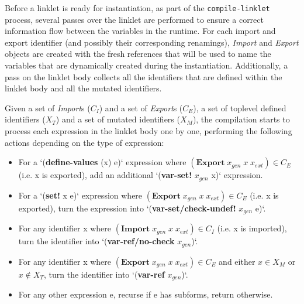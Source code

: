 Before a linklet is ready for instantiation, as part of the
\verb|compile-linklet| process, several passes over the linklet are
performed to ensure a correct information flow between the variables
in the run\dash time. For each import and export identifier (and
possibly their corresponding renamings), \textit{Import} and
\textit{Export} objects are created with the fresh references that
will be used to name the variables that are dynamically created during
the instantiation. Additionally, a pass on the linklet body collects
all the identifiers that are defined within the linklet body and all
the mutated identifiers.

Given a set of \textit{Import}s ($\mathit{C_I}$) and a set of
\textit{Export}s ($\mathit{C_E}$), a set of toplevel defined
identifiers ($\mathit{X_T}$) and a set of mutated identifiers
($\mathit{X_M}$), the compilation starts to process each expression in
the linklet body one by one, performing the following actions
depending on the type of expression:

\begin{itemize}
  \footnotesize
\item For a `(\textbf{define-values} (x) e)` expression where $(\textbf{Export}\; x_{gen}\; x\; x_{ext}) \in \mathit{C_E}$ (i.e. x is exported), add an additional `(\textbf{var-set!} $x_{gen}$ x)` expression.
\item For a `(\textbf{set!} x e)` expression where $(\textbf{Export}\; x_{gen}\; x\; x_{ext}) \in \mathit{C_E}$ (i.e. x is exported), turn the expression into `(\textbf{var-set/check-undef!} $x_{gen}$ e)`.
\item For any identifier x where $(\textbf{Import}\; x_{gen}\; x\; x_{ext}) \in \mathit{C_I}$ (i.e. x is imported), turn the identifier into `(\textbf{var-ref/no-check} $x_{gen}$)`.
\item For any identifier x where $(\textbf{Export}\; x_{gen}\; x\; x_{ext}) \in \mathit{C_E}$ and either $x \in \mathit{X_M}$ or $x \notin \mathit{X_T}$, turn the identifier into `(\textbf{var-ref} $x_{gen}$)`.
\item For any other expression e, recurse if e has subforms, return otherwise.
\end{itemize}

